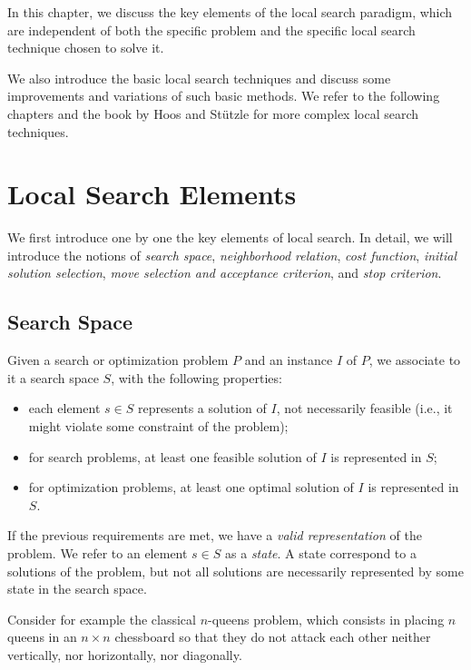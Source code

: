 In this chapter, we discuss the key elements of the local
search paradigm, which are independent of both the specific problem 
and the specific local search technique chosen to solve it.

We also introduce the basic local search techniques and discuss some
improvements and variations of such basic methods. We refer to
the following chapters %
and the book by Hoos and St\"utzle \cite{HoSt05} for more complex local search
techniques. %



\section{Local Search Elements}

We first introduce one by one the key elements of local search.  In
detail, we will introduce the notions of \emph{search space},
\emph{neighborhood relation}, \emph{cost function}, \emph{initial
  solution selection}, \emph{move selection and acceptance criterion},
and \emph{stop criterion}.

\subsection{Search Space}

Given a search or optimization problem $P$ and an instance $I$ of $P$, we
associate to it a search space $S$, with the following properties:

\begin{itemize}
\item each element $s\in S$ represents a solution of $I$, not
  necessarily feasible (i.e., it might violate some constraint of the problem);
\item for search problems, at least one feasible solution of $I$ is
  represented in $S$;
\item for optimization problems, at least one optimal solution of $I$
  is represented in $S$.
\end{itemize}

If the previous requirements are met, we have a \emph{valid
  representation} of the problem. We refer to an element $s\in S$ as a
\emph{state}. A state correspond to a solutions of the problem, but not all solutions are necessarily represented by some state in the search space.

Consider for example the classical $n$-queens problem, which consists
in placing $n$ queens in an $n\times n$ chessboard so that they do not
attack each other neither vertically, nor horizontally, nor diagonally.

